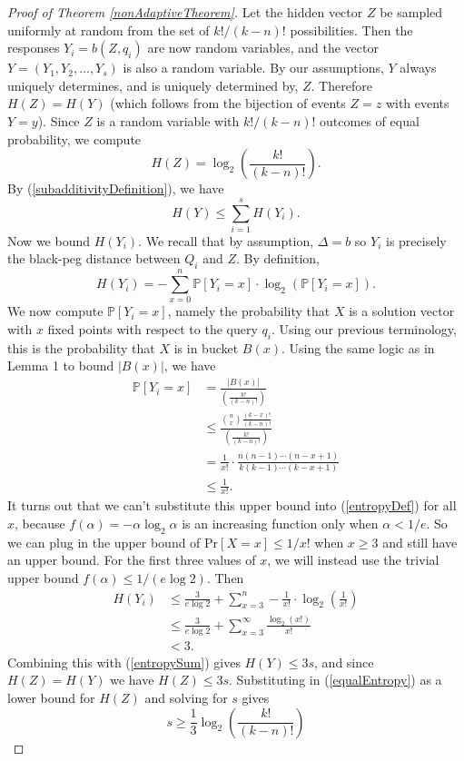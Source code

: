 \documentclass[12pt, a4paper]{article}
\begin{document}
\begin{proof}[Proof of Theorem \ref{nonAdaptiveTheorem}]
	Let the hidden vector $Z$ be sampled uniformly at random from the set of $k!/(k-n)!$ possibilities. Then the responses $Y_i = b(Z, q_i)$ are now random variables, and the vector $Y = (Y_1, Y_2, \ldots, Y_s)$ is also a random variable. By our assumptions, $Y$ always uniquely determines, and is uniquely determined by, $Z$. Therefore $H(Z) = H(Y)$ (which follows from the bijection of events $Z=z$ with events $Y=y$). Since $Z$ is a random variable with $k!/(k-n)!$ outcomes of equal probability, we compute
	\begin{equation}\label{equalEntropy}
		H(Z) = \log_2\left(\frac{k!}{(k-n)!}\right).
	\end{equation}
	By (\ref{subadditivityDefinition}), we have
	\begin{equation}\label{entropySum}
		H(Y)\le\sum_{i=1}^s H(Y_i).
	\end{equation}
	Now we bound $H(Y_i)$. We recall that by assumption, $\Delta = b$ so $Y_i$ is precisely the black-peg distance between $Q_i$ and $Z$. By definition,
	\begin{equation}\label{entropyDef}
		H(Y_i)=-\sum_{x=0}^n \mathbb{P}[Y_i=x]\cdot\log_2(\mathbb{P}[Y_{i}=x]).
	\end{equation}
	We now compute $\mathbb{P}[Y_i=x]$, namely the probability that $X$ is a solution vector with $x$ fixed points with respect to the query $q_i$. Using our previous terminology, this is the probability that $X$ is in bucket $B(x)$.
	Using the same logic as in Lemma 1 to bound $|B(x)|$, we have
	\begin{align*}
		\mathbb{P}[Y_i = x] &= \frac{|B(x)|}{\left(\frac{k!}{(k-n)!}\right)}\\
		&\leq \frac{\binom{n}{x}\frac{(k-x)!}{(k-n)!}}{\left(\frac{k!}{(k-n)!}\right)}\\
		&= \frac{1}{x!}\cdot\frac{n(n-1)\cdots(n-x+1)}{k(k-1)\cdots(k-x+1)}\\
		&\leq \frac{1}{x!}.
	\end{align*}
	It turns out that we can't substitute this upper bound into  (\ref{entropyDef}) for all $x$, because $f(\alpha)=-\alpha\log_2\alpha$ is an increasing function only when $\alpha<1/e$. So we can plug in the upper bound of $\text{Pr}[X=x]\le 1/x!$ when $x\ge 3$ and still have an upper bound. For the first three values of $x$, we will instead use the trivial upper bound $f(\alpha)\le 1/(e\log 2)$. Then
	\begin{align*}
		H(Y_i) &\leq \frac{3}{e\log 2}+\sum_{x=3}^n-\frac{1}{x!}\cdot\log_2\left(\frac{1}{x!}\right)\\
		&\le \frac{3}{e\log 2}+\sum_{x=3}^\infty \frac{\log_2(x!)}{x!}\\
		&<3.
	\end{align*}
	Combining this with (\ref{entropySum}) gives $H(Y) \leq 3s$, and since $H(Z) = H(Y)$ we have $H(Z) \leq 3s$. Substituting in (\ref{equalEntropy}) as a lower bound for $H(Z)$ and solving for $s$ gives
	\begin{equation*}
	s \geq \frac{1}{3}\log_2\left(\frac{k!}{(k-n)!}\right)
	\end{equation*}
	

\end{proof}
\end{document}
